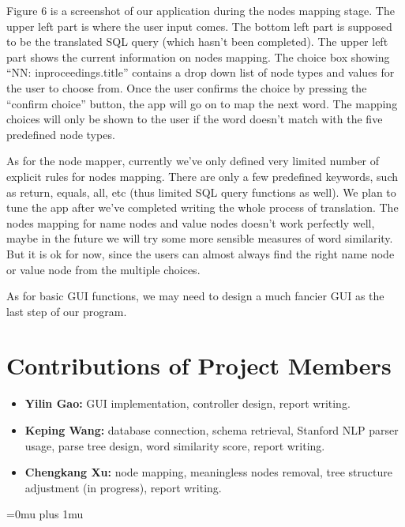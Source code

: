 \documentclass[twocolumn]{article}
\begin{document}
Figure 6 is a screenshot of our application during the nodes mapping stage. The upper left part is where the user input comes. The bottom left part is supposed to be the translated SQL query (which hasn’t been completed). The upper left part shows the current information on nodes mapping. The choice box showing “NN: inproceedings.title” contains a drop down list of node types and values for the user to choose from. Once the user confirms the choice by pressing the “confirm choice” button, the app will go on to map the next word. The mapping choices will only be shown to the user if the word doesn’t match with the five predefined node types.

As for the node mapper, currently we’ve only defined very limited number of explicit rules for nodes mapping. There are only a few predefined keywords, such as return, equals, all, etc (thus limited SQL query functions as well). We plan to tune the app after we’ve completed writing the whole process of translation. The nodes mapping for name nodes and value nodes doesn’t work perfectly well, maybe in the future we will try some more sensible measures of word similarity. But it is ok for now, since the users can almost always find the right name node or value node from the multiple choices. 

As for basic GUI functions, we may need to design a much fancier GUI as the last step of our program.

\section{Contributions of Project Members}

\begin{itemize}
\item {\bf Yilin Gao:} GUI implementation, controller design, report writing.
\item {\bf Keping Wang:} database connection, schema retrieval, Stanford NLP parser usage, parse tree design, word similarity score, report writing.
\item {\bf Chengkang Xu:} node mapping, meaningless nodes removal, tree structure adjustment (in progress), report writing.
\end{itemize}


\Urlmuskip=0mu plus 1mu\relax


\end{document}
